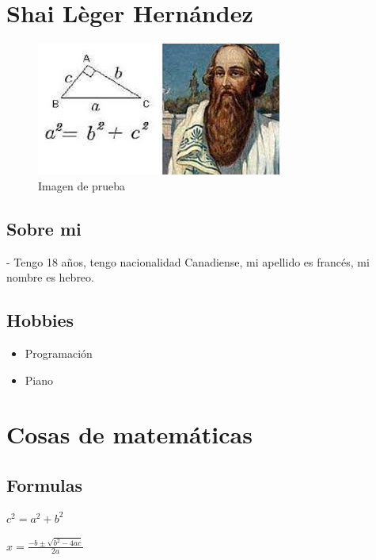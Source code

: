 \chapter{Shai Lèger Hernández}
	
	\begin{figure}[h]
		\centering
		\includegraphics[scale=1]{./IMG/5.png}     
		\caption{Imagen de prueba}
		\label{fig:prueba}
	\end{figure}

\section{Sobre mi}

     - Tengo 18 años, tengo nacionalidad Canadiense, mi apellido es francés, mi nombre es hebreo.
     
\section{Hobbies}

	\begin{itemize}
		\item Programación
		\item Piano
	\end{itemize}
	

\newpage
\chapter{Cosas de matemáticas}

\section{Formulas}

	\begin{itemize}
	\end{itemize}


